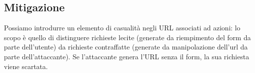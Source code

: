 \subsection{Mitigazione}
Possiamo introdurre un elemento di casualità negli URL associati ad azioni: lo scopo è quello di distinguere richieste lecite (generate da riempimento del form da parte dell'utente) da richieste contraffatte (generate da manipolazione dell'url da parte dell'attaccante). Se l'attaccante genera l'URL senza il form, la sua richiesta viene scartata.


\let\cleardoublepage\clearpage